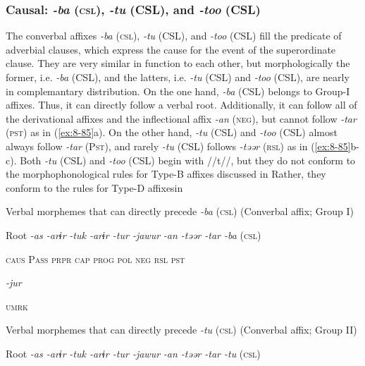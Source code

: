 \subsubsection{Causal: \textit{{}-ba} (\textsc{csl}), \textit{{}-tu} (CSL), and \textit{{}-too} (CSL)}

The converbal affixes \textit{{}-ba} (\textsc{csl}), \textit{{}-tu} (CSL), and \textit{{}-too} (CSL) fill the predicate of adverbial clauses, which express the cause for the event of the superordinate clause. They are very similar in function to each other, but morphologically the former, i.e. \textit{{}-ba} (CSL), and the latters, i.e. \textit{{}-tu} (CSL) and \textit{{}-too} (CSL), are nearly in complemantary distribution. On the one hand, \textit{{}-ba} (CSL) belongs to Group-I affixes. Thus, it can directly follow a verbal root. Additionally, it can follow all of the derivational affixes and the inflectional affix \textit{{}-an} (\textsc{neg}), but cannot follow \textit{{}-tar} (\textsc{pst}) as in (\ref{ex:8-85}a). On the other hand, \textit{{}-tu} (CSL) and \textit{{}-too} (CSL) almost always follow \textit{{}-tar} (P\textsc{st}), and rarely \textit{{}-tu} (CSL) follows \textit{{}-təər} (\textsc{rsl}) as in (\ref{ex:8-85}b-c). Both \textit{-tu} (CSL) and \textit{{}-too} (CSL) begin with //t//, but they do not conform to the morphophonological rules for Type-B affixes discussed in  Rather, they conform to the rules for Type-D affixesin 

\ea\label{ex:8-85}
\ea Verbal morphemes that can directly precede \textit{{}-ba} (\textsc{csl}) (Converbal affix; Group I)

  Root  \textit{{}-as  {}-arɨr} %
\textit{{}-tuk  {}-arɨr  {}-tur  {}-jawur} %
\textit{{}-an  {}-təər  {}-tar  {}-ba} (\textsc{csl})

    \textsc{caus}  P\textsc{ass}  \textsc{prpr}  \textsc{cap}  \textsc{prog}  \textsc{pol}  \textsc{neg}  \textsc{rsl}  \textsc{pst}

          \textit{{}-jur} 

          \textsc{umrk}

\ex Verbal morphemes that can directly precede \textit{{}-tu} (\textsc{csl}) (Converbal affix; Group II)

  Root  \textit{{}-as  {}-arɨr} %
\textit{{}-tuk  {}-arɨr  {}-tur  {}-jawur} %
\textit{{}-an  {}-təər  {}-tar  {}-tu} (\textsc{csl})

